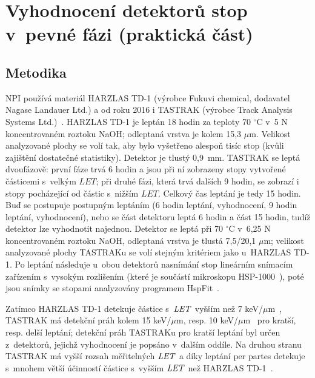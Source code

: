 \chapter{Vyhodnocení detektorů stop v~pevné fázi (praktická část)}
\section{Metodika}\label{sec:praktickaCast_metodika}
NPI používá materiál HARZLAS TD-1 (výrobce Fukuvi chemical, dodavatel Nagase Landauer Ltd.) a od roku 2016 i TASTRAK (výrobce Track Analysis Systems Ltd.)~\cite{cesky}. HARZLAS TD-1 je leptán 18 hodin za teploty 70 $^{\circ}$C v~5 N koncentrovaném roztoku NaOH; odleptaná vrstva je kolem 15,3 $\mu$m. Velikost analyzované plochy se volí tak, aby bylo vyšetřeno alespoň tisíc stop (kvůli zajištění dostatečné statistiky). Detektor je tlustý 0,9~mm. TASTRAK se leptá dvoufázově: první fáze trvá 6 hodin a jsou při ní zobrazeny stopy vytvořené částicemi s~velkým $\mathit{LET}$; při druhé fázi, která trvá dalších 9 hodin, se zobrazí i stopy pocházející od částic s~nižším $\mathit{LET}$. Celkový čas leptání je tedy 15 hodin. Buď se postupuje postupným leptáním (6 hodin leptání, vyhodnocení, 9 hodin leptání, vyhodnocení), nebo se část detektoru leptá 6 hodin a část 15 hodin, tudíž
detektor lze vyhodnotit najednou. Detektor se leptá při 70 $^{\circ}$C v~6,25 N koncentrovaném roztoku NaOH, odleptaná vrstva je tlustá 7,5/20,1 $\mu$m; velikost analyzované plochy TASTRAKu se volí stejným kritériem jako u~HARZLAS TD-1. Po leptání následuje u~obou detektorů nasnímání stop lineárním snímacím zařízením s~vysokým rozlišením (které je součástí mikroskopu HSP-1000~\cite{dosis_HSP1000}), poté jsou snímky se stopami analyzovány programem HspFit~\cite{hspClanek}.

Zatímco HARZLAS TD-1 detekuje částice s~$\mathit{LET}$ vyšším než 7 keV/$\mu$m~\cite{cesky}, TASTRAK má detekční práh kolem 15 keV/$\mu$m, resp. 10 keV/$\mu$m~\cite{ssntd} pro kratší, resp. delší leptání; detekční práh TASTRAKu pro kratší leptání byl určen z~detektorů, jejichž vyhodnocení je popsáno v~dalším oddíle. Na druhou stranu TASTRAK má vyšší rozsah měřitelných $\mathit{LET}$ a díky leptání per partes detekuje s~mnohem větší účinností částice s~vyšším $\mathit{LET}$ než HARZLAS TD-1~\cite{cesky}.
\newpage
